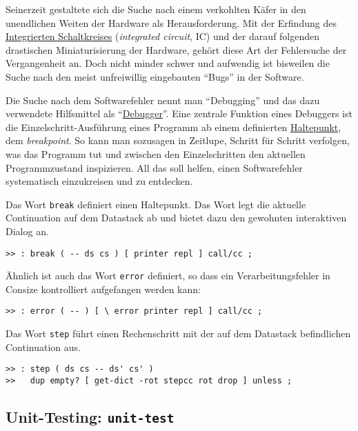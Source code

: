 Seinerzeit gestaltete sich die Suche nach einem verkohlten Käfer in den unendlichen Weiten der Hardware als Herausforderung. Mit der Erfindung des \href{http://de.wikipedia.org/wiki/Integrierter\_Schaltkreis}{Integrierten Schaltkreises} (\emph{integrated circuit}, IC) und der darauf folgenden drastischen Miniaturisierung der Hardware, gehört diese Art der Fehlersuche der Vergangenheit an. Doch nicht minder schwer und aufwendig ist bisweilen die Suche nach den meist unfreiwillig eingebauten "`Bugs"' in der Software.

Die Suche nach dem Softwarefehler nennt man "`Debugging"' und das dazu verwendete Hilfsmittel als "`\href{http://de.wikipedia.org/wiki/Debugger}{Debugger}"'. Eine zentrale Funktion eines Debuggers ist die Einzelschritt-Ausführung eines Programm ab einem definierten \href{http://de.wikipedia.org/wiki/Debugger#Haltepunkte}{Haltepunkt}, dem \emph{breakpoint}. So kann man sozusagen in Zeitlupe, Schritt für Schritt verfolgen, was das Programm tut und zwischen den Einzelschritten den aktuellen Programmzustand inspizieren. All das soll helfen, einen Softwarefehler systematisch einzukreisen und zu entdecken. 

Das Wort \verb|break| definiert einen Haltepunkt. Das Wort legt die aktuelle Continuation auf dem Datastack ab und bietet dazu den gewohnten interaktiven Dialog an.

\begin{verbatim}
>> : break ( -- ds cs ) [ printer repl ] call/cc ;
\end{verbatim}

Ähnlich ist auch das Wort \verb|error| definiert, so dass ein Verarbeitungsfehler in Consize kontrolliert aufgefangen werden kann:

\begin{verbatim}
>> : error ( -- ) [ \ error printer repl ] call/cc ;
\end{verbatim}

Das Wort \verb|step| führt einen Rechenschritt mit der auf dem Datastack befindlichen Continuation aus.

\begin{verbatim}
>> : step ( ds cs -- ds' cs' )
>>   dup empty? [ get-dict -rot stepcc rot drop ] unless ;
\end{verbatim}

\subsection{Unit-Testing: \texttt{unit-test}}

